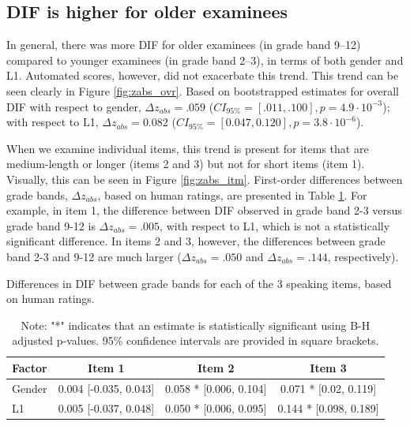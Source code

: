 \documentclass [PhD] {uclathes}
\begin{document}
\subsection{DIF is higher for older examinees}

In general, there was more DIF for older examinees (in grade band 9–12) compared to younger examinees (in grade band 2–3), in terms of both gender and L1. Automated scores, however, did not exacerbate this trend. This trend can be seen clearly in Figure \ref{fig:zabs_ovr}. Based on bootstrapped estimates for overall DIF with respect to gender, $\Delta z_{abs} = .059$ ($CI_{95\%} = [.011, .100], p = 4.9 \cdot 10^{-3}$); with respect to L1, $\Delta z_{abs} = 0.082$ ($CI_{95\%} = [0.047, 0.120], p = 3.8 \cdot 10^{-6}$). 

When we examine individual items, this trend is present for items that are medium-length or longer (items 2 and 3) but not for short items (item 1). Visually, this can be seen in Figure \ref{fig:zabs_itm}. First-order differences between grade bands, $\Delta z_{abs}$, based on human ratings, are presented in Table \ref{gr_diff}. For example, in item 1, the difference between DIF observed in grade band 2-3 versus grade band 9-12 is $\Delta z_{abs} = .005$, with respect to L1, which is not a statistically significant difference. In items 2 and 3, however, the differences between grade band 2-3 and 9-12 are much larger ($\Delta z_{abs} = .050$ and $\Delta z_{abs} = .144$, respectively). 

\begin{table}[htbp]
\centering
\caption{\label{gr_diff}
Differences in DIF between grade bands for each of the 3 speaking items, based on human ratings.}
\small  %
\begin{tabular}{lccc}
\toprule
\textbf{Factor} & \textbf{Item 1} & \textbf{Item 2} & \textbf{Item 3} \\
\midrule
Gender & 0.004 [-0.035, 0.043] & 0.058 * [0.006, 0.104] & 0.071 * [0.02, 0.119] \\
L1 & 0.005 [-0.037, 0.048] & 0.050 * [0.006, 0.095] & 0.144 * [0.098, 0.189] \\
\bottomrule
\end{tabular}
\caption*{\small Note: "*" indicates that an estimate is statistically significant using B-H adjusted p-values. 95\% confidence intervals are provided in square brackets.}
\end{table}
\end{document}
